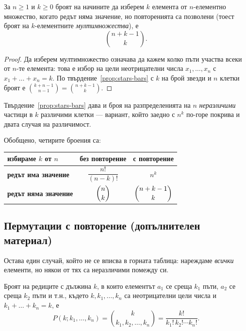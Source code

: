 \begin{cor}\label{cor:multiset}
За $n\ge1$ и $k\ge0$ броят на начините да изберем $k$ елемента от $n$-елементно множество, когато редът няма
значение, но повторенията са позволени (тоест броят на $k$-елементните
\emph{мултимножества}), е
\[ \binom{n+k-1}{k} . \]
\end{cor}

\begin{proof}
Да изберем мултимножество означава да кажем колко пъти участва всеки от $n$-те елемента:
това е избор на цели неотрицателни числа $x_1, \dots, x_n$ с $x_1 + \dots + x_n = k$.
По твърдение~\ref{prop:stars-bars} с $k$ на брой звезди и $n$ клетки броят е
$\binom{k+n-1}{n-1} = \binom{n+k-1}{k}$.
\end{proof}

Твърдение~\ref{prop:stars-bars} дава и броя на разпределенията на $n$ \emph{неразличими}
частици в $k$ различими клетки — вариант, който заедно с $n^k$ по-горе покрива и двата
случая на различимост.

Обобщено, четирите броения са:

\begin{center}
\begin{tabular}{@{}l|cc@{}}
избираме $k$ от $n$ & \textbf{без повторение} & \textbf{с повторение} \\ \hline
\textbf{редът има значение} & $\dfrac{n!}{(n-k)!}$ & $n^k$ \\[10pt]
\textbf{редът няма значение} & $\dbinom{n}{k}$ & $\dbinom{n+k-1}{k}$ \\
\end{tabular}
\end{center}

\subsection{Пермутации с повторение \textnormal{(допълнителен материал)}}
Остава един случай, който не се вписва в горната таблица: нареждаме \emph{всички}
елементи, но някои от тях са неразличими помежду си.

\begin{prop}\label{prop:multinomial}
Броят на редиците с дължина $k$, в които елементът $a_1$ се среща $k_1$ пъти, $a_2$ се
среща $k_2$ пъти и т.н., където $k,k_1,\dots,k_n$ са неотрицателни цели числа и
$k_1 + \dots + k_n = k$, е
\[
P(k; k_1, \dots, k_n) = \binom{k}{k_1, k_2, \dots, k_n} = \frac{k!}{k_1!\,k_2! \cdots k_n!} .
\]
\end{prop}

